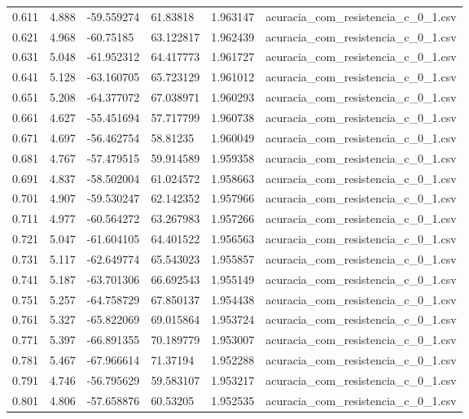 \begin{table}
\begin{tabular}{llllll}
0.611 & 4.888 & -59.559274 & 61.83818 & 1.963147 & acuracia\_com\_resistencia\_c\_0\_1.csv \\
0.621 & 4.968 & -60.75185 & 63.122817 & 1.962439 & acuracia\_com\_resistencia\_c\_0\_1.csv \\
0.631 & 5.048 & -61.952312 & 64.417773 & 1.961727 & acuracia\_com\_resistencia\_c\_0\_1.csv \\
0.641 & 5.128 & -63.160705 & 65.723129 & 1.961012 & acuracia\_com\_resistencia\_c\_0\_1.csv \\
0.651 & 5.208 & -64.377072 & 67.038971 & 1.960293 & acuracia\_com\_resistencia\_c\_0\_1.csv \\
0.661 & 4.627 & -55.451694 & 57.717799 & 1.960738 & acuracia\_com\_resistencia\_c\_0\_1.csv \\
0.671 & 4.697 & -56.462754 & 58.81235 & 1.960049 & acuracia\_com\_resistencia\_c\_0\_1.csv \\
0.681 & 4.767 & -57.479515 & 59.914589 & 1.959358 & acuracia\_com\_resistencia\_c\_0\_1.csv \\
0.691 & 4.837 & -58.502004 & 61.024572 & 1.958663 & acuracia\_com\_resistencia\_c\_0\_1.csv \\
0.701 & 4.907 & -59.530247 & 62.142352 & 1.957966 & acuracia\_com\_resistencia\_c\_0\_1.csv \\
0.711 & 4.977 & -60.564272 & 63.267983 & 1.957266 & acuracia\_com\_resistencia\_c\_0\_1.csv \\
0.721 & 5.047 & -61.604105 & 64.401522 & 1.956563 & acuracia\_com\_resistencia\_c\_0\_1.csv \\
0.731 & 5.117 & -62.649774 & 65.543023 & 1.955857 & acuracia\_com\_resistencia\_c\_0\_1.csv \\
0.741 & 5.187 & -63.701306 & 66.692543 & 1.955149 & acuracia\_com\_resistencia\_c\_0\_1.csv \\
0.751 & 5.257 & -64.758729 & 67.850137 & 1.954438 & acuracia\_com\_resistencia\_c\_0\_1.csv \\
0.761 & 5.327 & -65.822069 & 69.015864 & 1.953724 & acuracia\_com\_resistencia\_c\_0\_1.csv \\
0.771 & 5.397 & -66.891355 & 70.189779 & 1.953007 & acuracia\_com\_resistencia\_c\_0\_1.csv \\
0.781 & 5.467 & -67.966614 & 71.37194 & 1.952288 & acuracia\_com\_resistencia\_c\_0\_1.csv \\
0.791 & 4.746 & -56.795629 & 59.583107 & 1.953217 & acuracia\_com\_resistencia\_c\_0\_1.csv \\
0.801 & 4.806 & -57.658876 & 60.53205 & 1.952535 & acuracia\_com\_resistencia\_c\_0\_1.csv \\

\end{tabular}
\end{table}
